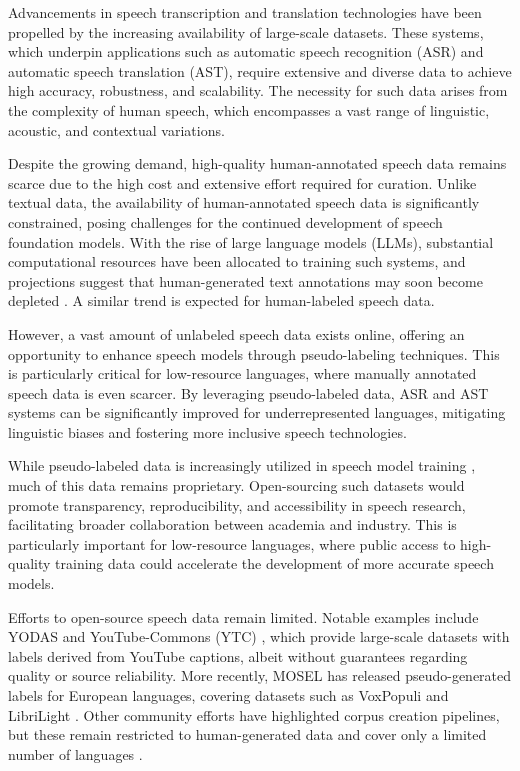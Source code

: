 Advancements in speech transcription and translation technologies have been propelled by the increasing availability of large-scale datasets. These systems, which underpin applications such as automatic speech recognition (ASR) and automatic speech translation (AST), require extensive and diverse data to achieve high accuracy, robustness, and scalability. The necessity for such data arises from the complexity of human speech, which encompasses a vast range of linguistic, acoustic, and contextual variations.

Despite the growing demand, high-quality human-annotated speech data remains scarce due to the high cost and extensive effort required for curation. Unlike textual data, the availability of human-annotated speech data is significantly constrained, posing challenges for the continued development of speech foundation models. With the rise of large language models (LLMs), substantial computational resources have been allocated to training such systems, and projections suggest that human-generated text annotations may soon become depleted \cite{villalobos2022will}. A similar trend is expected for human-labeled speech data.

However, a vast amount of unlabeled speech data exists online, offering an opportunity to enhance speech models through pseudo-labeling techniques. This is particularly critical for low-resource languages, where manually annotated speech data is even scarcer. By leveraging pseudo-labeled data, ASR and AST systems can be significantly improved for underrepresented languages, mitigating linguistic biases and fostering more inclusive speech technologies.


While pseudo-labeled data is increasingly utilized in speech model training \cite{barrault2023seamless,puvvada2024less}, much of this data remains proprietary. Open-sourcing such datasets would promote transparency, reproducibility, and accessibility in speech research, facilitating broader collaboration between academia and industry. This is particularly important for low-resource languages, where public access to high-quality training data could accelerate the development of more accurate speech models.

Efforts to open-source speech data remain limited. Notable examples include YODAS \cite{li2024yodasyoutubeorienteddatasetaudio} and YouTube-Commons (YTC)
\cite{pleias2025youtube}, which provide large-scale datasets with labels derived from YouTube captions, albeit without guarantees regarding quality or source reliability. More recently, MOSEL \cite{mosel} has released pseudo-generated labels for European languages, covering datasets such as VoxPopuli \cite{wang-etal-2021-voxpopuli} and LibriLight \cite{kahn2020libri}. Other community efforts have highlighted corpus creation pipelines, but these remain restricted to human-generated data and cover only a limited number of languages \cite{chen2021gigaspeechevolvingmultidomainasr}.

